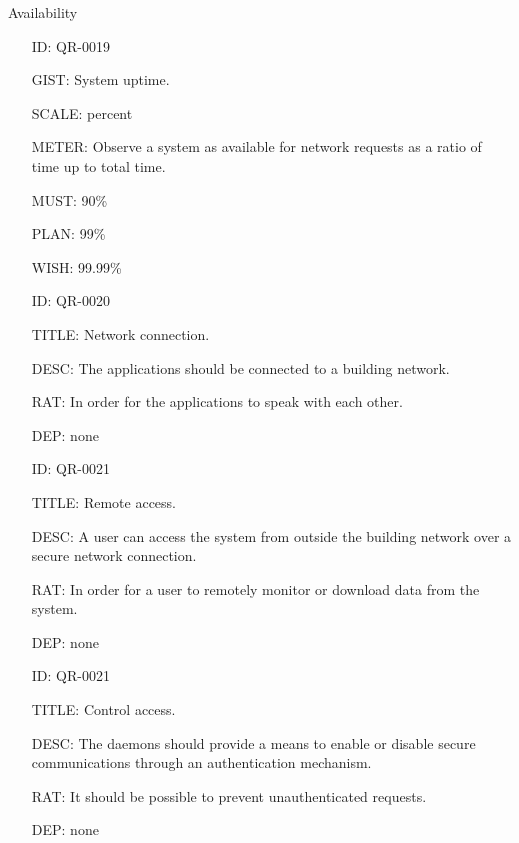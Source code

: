         Availability

        \begin{itemize}
          \setlength{\itemindent}{.5in}
          \itemsep .15em
          \item[ID:] QR-0019
          \item[GIST:] System uptime.
          \item[SCALE:] percent
          \item[METER:] Observe a system as available for network requests as a
            ratio of time up to total time.
          \item[MUST:] 90\%
          \item[PLAN:] 99\%
          \item[WISH:] 99.99\%
        \end{itemize}

        \begin{itemize}
          \setlength{\itemindent}{.5in}
          \itemsep .15em
          \item[ID:] QR-0020
          \item[TITLE:] Network connection.
          \item[DESC:] The applications should be connected to a building
            network.
          \item[RAT:] In order for the applications to speak with each other.
          \item[DEP:] none
        \end{itemize}

        \begin{itemize}
          \setlength{\itemindent}{.5in}
          \itemsep .15em
          \item[ID:] QR-0021
          \item[TITLE:] Remote access.
          \item[DESC:] A user can access the system from outside the building
            network over a secure network connection.
          \item[RAT:] In order for a user to remotely monitor or download data
            from the system.
          \item[DEP:] none
        \end{itemize}

        \begin{itemize}
          \setlength{\itemindent}{.5in}
          \itemsep .15em
          \item[ID:] QR-0021
          \item[TITLE:] Control access.
          \item[DESC:] The daemons should provide a means to enable or disable
            secure communications through an authentication mechanism.
          \item[RAT:] It should be possible to prevent unauthenticated requests.
          \item[DEP:] none
        \end{itemize}

